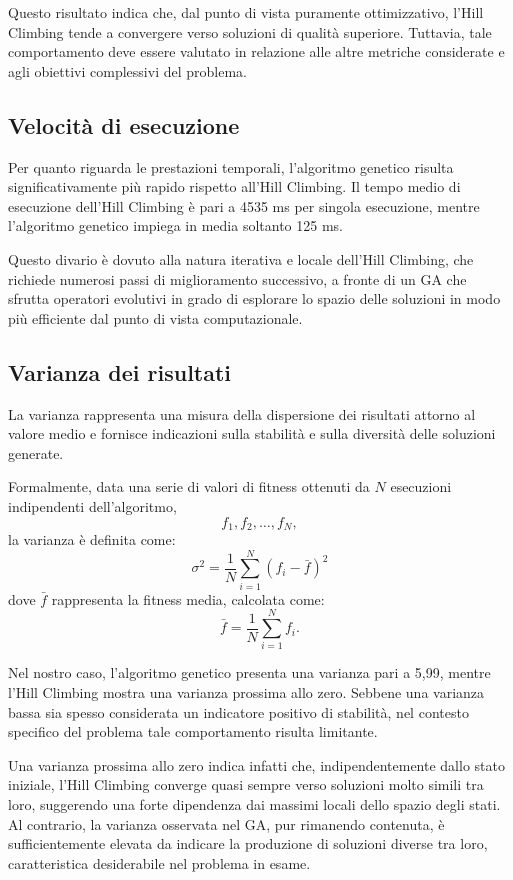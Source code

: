 \documentclass{article}
\begin{document}
Questo risultato indica che, dal punto di vista puramente ottimizzativo, l’Hill Climbing tende a convergere verso soluzioni di qualità superiore. Tuttavia, tale comportamento deve essere valutato in relazione alle altre metriche considerate e agli obiettivi complessivi del problema.

\subsection{Velocità di esecuzione}

Per quanto riguarda le prestazioni temporali, l’algoritmo genetico risulta significativamente più rapido rispetto all’Hill Climbing.  
Il tempo medio di esecuzione dell’Hill Climbing è pari a 4535 ms per singola esecuzione, mentre l’algoritmo genetico impiega in media soltanto 125 ms.

Questo divario è dovuto alla natura iterativa e locale dell’Hill Climbing, che richiede numerosi passi di miglioramento successivo, a fronte di un GA che sfrutta operatori evolutivi in grado di esplorare lo spazio delle soluzioni in modo più efficiente dal punto di vista computazionale.

\subsection{Varianza dei risultati}

La varianza rappresenta una misura della dispersione dei risultati attorno al valore medio e fornisce indicazioni sulla stabilità e sulla diversità delle soluzioni generate.

Formalmente, data una serie di valori di fitness ottenuti da $N$ esecuzioni indipendenti dell’algoritmo,
\[
f_1, f_2, \dots, f_N,
\]
la varianza è definita come:
\[
\sigma^2 = \frac{1}{N} \sum_{i=1}^{N} (f_i - \bar{f})^2
\]
dove $\bar{f}$ rappresenta la fitness media, calcolata come:
\[
\bar{f} = \frac{1}{N} \sum_{i=1}^{N} f_i.
\]

Nel nostro caso, l’algoritmo genetico presenta una varianza pari a 5{,}99, mentre l’Hill Climbing mostra una varianza prossima allo zero.  
Sebbene una varianza bassa sia spesso considerata un indicatore positivo di stabilità, nel contesto specifico del problema tale comportamento risulta limitante.

Una varianza prossima allo zero indica infatti che, indipendentemente dallo stato iniziale, l’Hill Climbing converge quasi sempre verso soluzioni molto simili tra loro, suggerendo una forte dipendenza dai massimi locali dello spazio degli stati.  
Al contrario, la varianza osservata nel GA, pur rimanendo contenuta, è sufficientemente elevata da indicare la produzione di soluzioni diverse tra loro, caratteristica desiderabile nel problema in esame.
\end{document}
